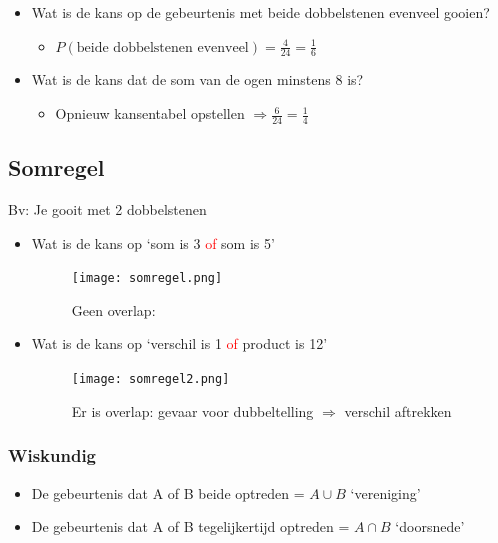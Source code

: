 \documentclass{article}
\begin{document}
\begin{itemize}
    \item Wat is de kans op de gebeurtenis met beide dobbelstenen evenveel gooien?
    \begin{itemize}
        \begin{figure}[H]
            \centering
            \texttt{[image: gecombineerd-experiment-oef1.png]}
            \caption{Kansentabel opstellen}
        \end{figure}
        \item $P(\text{beide dobbelstenen evenveel}) = \frac{4}{24} = \frac{1}{6}$
    \end{itemize}
    \item Wat is de kans dat de som van de ogen minstens 8 is?
    \begin{itemize}
        \item Opnieuw kansentabel opstellen $\Rightarrow \frac{6}{24} = \frac{1}{4}$ 
    \end{itemize}
\end{itemize}

\subsection{Somregel}

Bv: Je gooit met 2 dobbelstenen

\begin{itemize}
    \item Wat is de kans op `som is 3 \textcolor{red}{of} som is 5'
    \begin{figure}[H]
        \centering
        \texttt{[image: somregel.png]}
        \caption{Geen overlap: }
    \end{figure}
    
    \item Wat is de kans op `verschil is 1 \textcolor{red}{of} product is 12'
    \begin{figure}[H]
        \centering
        \texttt{[image: somregel2.png]}
        \caption{Er is overlap: gevaar voor dubbeltelling $\Rightarrow$ verschil aftrekken}
    \end{figure}
\end{itemize}

\subsubsection{Wiskundig}

\begin{itemize}
    \item De gebeurtenis dat A of B beide optreden = $A \cup B$ `vereniging'
    \item De gebeurtenis dat A of B tegelijkertijd optreden = $A \cap B$ `doorsnede'
\end{itemize}
\end{document}
